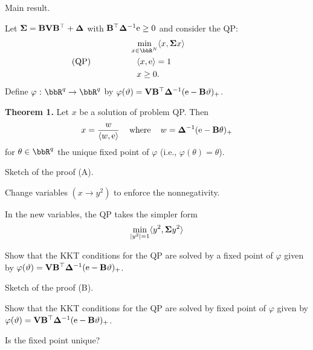 \documentclass[11pt,leqno]{beamer}
\begin{document}
\begin{frame}{Main result.}

Let $\bm{\Sigma} = \mathbf{B} \mathbf{V} \mathbf{B}^\top + \bm{\Delta}$ with
$\mathbf{B}^\top \bm{\Delta}^{-1} \mathrm{e} \ge 0$
and consider the QP:
 \begin{align*}  
&\min_{x \in \bbR^{\nv}} \prj{x}{\bsig x}
  \\  \text{(QP)}\hspace{0.64in} &\hspace{8pt} \prj{x}{\rme} = 1  
  \hspace{1.16in}
  \\ &\hspace{8pt} x \ge  0 .
\end{align*}
Define  $\varphi \cst \bbR^q \to \bbR^q$ by
$\varphi (\vartheta) = \mathbf{V} \mathbf{B}^\top
\bm{\Delta}^{-1} (\mathrm{e} - \mathbf{B} \vartheta)_+$.

{\bf Theorem 1.} Let $x$ be a solution of 
problem QP. Then
\begin{align}
   x = \frac{w}{\langle w, \mathrm{e} \rangle}
  \hspace{0.16in}
  \text{where} 
  \hspace{0.16in} 
   w = \bm{\Delta}^{-1} (\mathrm{e} - \mathbf{B} \theta)_+
\end{align}
for $\theta \in \bbR^q$ the unique  fixed
point of $\varphi$ (i.e., $\varphi(\theta) = \theta$).

\end{frame}




\begin{frame}{Sketch of the proof (A).}

Change variables $(x \to y^2)$ to enforce the 
nonnegativity.

In the new variables, the QP takes the simpler form
\begin{align}
  \min_{ |y^2| = 1} \langle y^2, \bm{\Sigma} y^2 \rangle 
\end{align}

Show that the KKT conditions for the QP are solved by
a fixed point of $\varphi$
given by $\varphi (\vartheta) = \mathbf{V} \mathbf{B}^\top
\bm{\Delta}^{-1} (\mathrm{e} - \mathbf{B} \vartheta)_+$.


\end{frame}


\begin{frame}{Sketch of the proof (B).}


Show that the KKT conditions for the QP are solved by
 fixed point of $\varphi$
given by $\varphi (\vartheta) = \mathbf{V} \mathbf{B}^\top
\bm{\Delta}^{-1} (\mathrm{e} - \mathbf{B} \vartheta)_+$.


Is the fixed point unique?

\end{frame}
\end{document}
